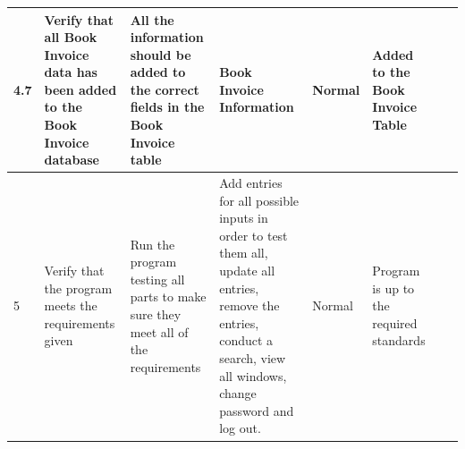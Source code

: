 \begin{landscape}
\begin{center}
\begin{longtable}{|p{1.5cm}|p{2.5cm}|p{2.5cm}|p{2cm}|p{2cm}|p{2cm}|p{2cm}|p{2cm}|}
        4.7 & Verify that all Book Invoice data has been added to the Book Invoice database & All the information should be added to the correct fields in the Book Invoice table & Book Invoice Information & Normal & Added to the Book Invoice Table & & \\ \hline
        5 & Verify that the program meets the requirements given & Run the program testing all parts to make sure they meet all of the requirements & Add entries for all possible inputs in order to test them all, update all entries, remove the entries, conduct a search, view all windows, change password and log out. & Normal & Program is up to the required standards & & \\ \hline


    \end{longtable}
\end{center}
\end{landscape}